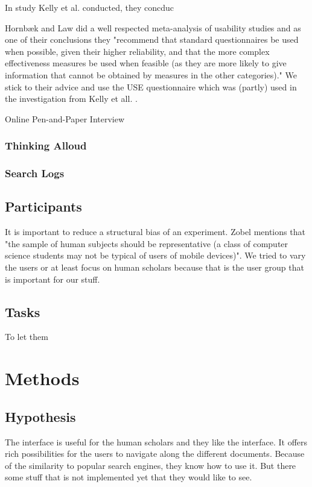 \documentclass[11pt]{report}
\begin{document}
In study Kelly et al. conducted, they concduc

Hornbæk and Law did a well respected meta-analysis of usability studies and as one of their conclusions they "recommend that standard questionnaires be used when possible, given their higher reliability, and that the more complex effectiveness measures be used when feasible (as they are more likely to give information that cannot be obtained by measures in the other categories)." \cite{Hornb2007} We stick to their advice and use the USE questionnaire \cite{lund2001measuring} which was (partly) used in the investigation from Kelly et all. \cite{Kelly2008}.

Online Pen-and-Paper Interview

\subsubsection{Thinking Alloud}

\subsubsection{Search Logs}

\subsection{Participants}

It is important to reduce a structural bias of an experiment. Zobel \cite{Zobel2004} mentions that "the sample of human subjects should be representative (a class of computer science students may not be typical of users of mobile devices)". We tried to vary the users or at least focus on human scholars because that is the user group that is important for our stuff.

\subsection{Tasks}

To let them 

\section{Methods}

\subsection{Hypothesis}

The interface is useful for the human scholars and they like the interface. It offers rich possibilities for the users to navigate along the different documents. Because of the similarity to popular search engines, they know how to use it. But there some stuff that is not implemented yet that they would like to see.
\end{document}
